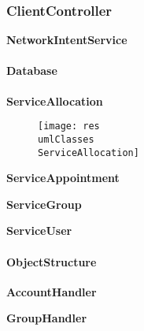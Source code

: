 \subsubsection{ClientController}

\textbf{NetworkIntentService}

\paragraph{Database}

\textbf{ServiceAllocation}
 \begin{figure}[H]
 	\centering
 	\texttt{[image: res\\umlClasses\\ServiceAllocation]}
 \end{figure}


\textbf{ServiceAppointment}

\textbf{ServiceGroup}

\textbf{ServiceUser}

\paragraph{ObjectStructure}

\textbf{AccountHandler}

\textbf{GroupHandler}
